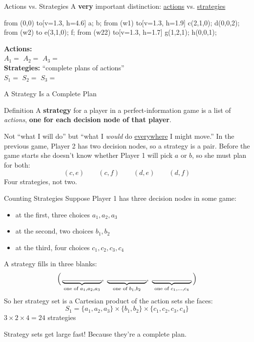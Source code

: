 \begin{frame}{Actions vs. Strategies}
A \textbf{very} important distinction: \uline{actions} vs. \uline{strategies}
\begin{center}
    \begin{gametree}[labels=short, scale=0.9]
  \branch[player=1, root=w, label=90] from (0,0) to[v=1.3, h=4.6] {a; b};
  \branch[player=2, label=135] from (w1) to[v=1.3, h=1.9] {c(2,1,0); d(0,0,2)};
  \branch[label=45] from (w2) to {e(3,1,0); f};
  \branch[player=3, label=45] from (w22) to[v=1.3, h=1.7] {g(1,2,1); h(0,0,1)};
\end{gametree}
\end{center}
\textbf{Actions:}\\
$A_1=$ \hspace{1in} $A_2=$ \hspace{2in} $A_3=$\\
\textbf{Strategies:} ``complete plans of actions''\\
$S_1=$ \hspace{1in} $S_2=$ \hspace{2in} $S_3=$
\end{frame}

\begin{frame}{A Strategy Is a Complete Plan}
\begin{block}{Definition}
A \textbf{strategy} for a player in a perfect-information game is a list of \textit{actions},
\textbf{one for each decision node of that player}.
\end{block}
\bsk
Not ``what I will do'' but ``what I \textit{would} do \uline{everywhere} I might move.''
\bsk
In the previous game, Player 2 has two decision nodes, so a strategy is a pair.
Before the game starts she doesn't know whether Player 1 will pick $a$ or $b$,
so she must plan for both:
$$(c,e)\qquad (c,f)\qquad (d,e)\qquad (d,f)$$
\vfill
Four strategies, not two.
\vspace{-0.4in}
\end{frame}

\begin{frame}{Counting Strategies}
Suppose Player 1 has three decision nodes in some game:
\begin{itemize}
    \item at the first, three choices $a_1,a_2,a_3$
    \item at the second, two choices $b_1,b_2$
    \item at the third, four choices $c_1,c_2,c_3,c_4$
\end{itemize}
A strategy fills in three blanks:
$$\Big(\underbrace{\rule{0.8in}{0.4pt}}_{\text{one of } a_1,a_2,a_3},\
\underbrace{\rule{0.8in}{0.4pt}}_{\text{one of } b_1,b_2},\
\underbrace{\rule{0.8in}{0.4pt}}_{\text{one of } c_1,\ldots,c_4}\Big)$$
\bsk
So her strategy set is a Cartesian product of the action sets she faces:
$$S_1=\{a_1,a_2,a_3\}\times\{b_1,b_2\}\times\{c_1,c_2,c_3,c_4\}$$
\centering
$3\times 2\times 4 = 24$ strategies

\raggedright
Strategy sets get large fast! Because they're a complete plan.
\vspace{-0.4in}
\end{frame}

